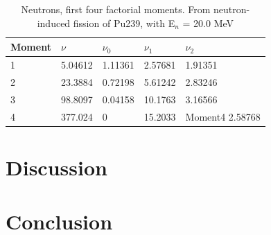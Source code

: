 \documentclass[]{article}
\begin{document}
\begin{table} [H]
	\centering
	\caption{Neutrons, first four factorial moments. From neutron-induced fission of Pu239, with E$_n$ = 20.0 MeV }
	\begin{tabularx}{\textwidth}{XXXXX} \hline
		\label{Pu239_n_moments_20}
		Moment & $\nu$ & $\nu_0$ & $\nu_1$ & $\nu_2$ \\ \hline
		1 & 5.04612 & 1.11361 & 2.57681 & 1.91351\\
		2 & 23.3884 & 0.72198 & 5.61242 & 2.83246\\
		3 & 98.8097 & 0.04158 & 10.1763 & 3.16566\\
		4 & 377.024 & 0 & 15.2033 & Moment4 2.58768\\ 
	\end{tabularx}
\end{table}

\section{Discussion}

\section{Conclusion}

\vspace{3mm}
\end{document}
